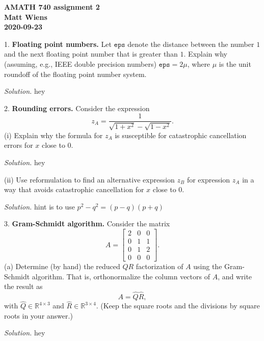 \documentclass{article}
\newcommand{\R}{\mathbb{R}}
\begin{document}
\textbf{AMATH 740 assignment 2} \\
\textbf{Matt Wiens} \\
\textbf{2020-09-23}

1. \textbf{Floating point numbers.}
Let $\texttt{eps}$ denote the distance between the number $1$ and
the next floating point number that is greater than $1$. Explain why
(assuming, e.g., IEEE double precision numbers) $\texttt{eps} = 2 \mu$,
where $\mu$ is the unit roundoff of the floating point number system.

\textit{Solution.}
hey

\newpage

2. \textbf{Rounding errors.}
Consider the expression
%
\begin{equation*}
    z_A = \frac{1}{\sqrt{1 + x^2} - \sqrt{1 - x^2}}.
\end{equation*}
%
(i) Explain why the formula for $z_A$ is susceptible for catastrophic
cancellation errors for $x$ close to $0$.

\textit{Solution.}
hey

\vspace{5mm}

(ii) Use reformulation to find an alternative expression $z_B$ for expression
$z_A$ in a way that avoids catastrophic cancellation for $x$ close to $0$.

\textit{Solution.}
hint is to use $p^2 - q^2 = (p - q)(p+q)$

\newpage

3. \textbf{Gram-Schmidt algorithm.}
Consider the matrix
%
\begin{equation*}
    A =
    \begin{bmatrix}
        2 & 0 & 0 \\
        0 & 1 & 1 \\
        0 & 1 & 2 \\
        0 & 0 & 0
    \end{bmatrix}
    .
\end{equation*}
%
(a) Determine (by hand) the reduced $QR$ factorization of $A$ using the
Gram-Schmidt algorithm. That is, orthonormalize the column vectors of $A$,
and write the result as
%
\begin{equation*}
    A = \hat{Q} \hat{R},
\end{equation*}
%
with $\hat{Q} \in \R^{4 \times 3}$ and $\hat{R} \in \R^{3 \times 4}$. (Keep
the square roots and the divisions by square roots in your answer.)

\textit{Solution.}
hey
\end{document}

